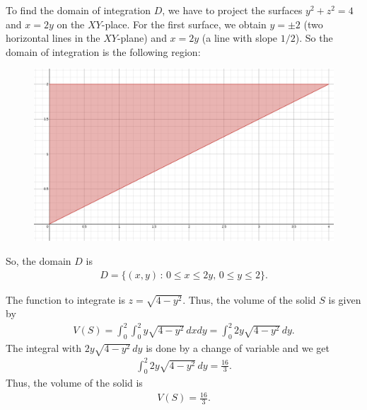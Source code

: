	To find the domain of integration $D$, we have to project the surfaces $y^2 + z^2 = 4$ and $x = 2y$ on the $XY$-place. For the first surface, we obtain $y = \pm 2$ (two horizontal lines in the $XY$-plane) and $x = 2y$ (a line with slope $1/2$). So the domain of integration is the following region:
	\begin{figure}[h]
	\centering
	\includegraphics[scale=0.2]{sketch-Exo30_Domain.png}
	\end{figure}
	So, the domain $D$ is
		\begin{align*}
		D = \{ (x, y) \, : \, 0 \leq x \leq 2y \text{, } 0 \leq y \leq 2 \} .
		\end{align*}
	
	The function to integrate is $z = \sqrt{4 - y^2}$. Thus, the volume of the solid $S$ is given by
		\begin{align*}
		V (S) = \int_0^2 \int_{0}^2y \sqrt{4 - y^2} \, dx dy = \int_0^2 2y\sqrt{4 - y^2} \, dy .
		\end{align*}
	The integral with $2y \sqrt{4 - y^2} \, dy$ is done by a change of variable and we get
		\begin{align*}
		\int_0^2 2y \sqrt{4 - y^2} \, dy = \frac{16}{3} .
		\end{align*}
	Thus, the volume of the solid is
		\begin{align*}
		V (S) = \frac{16}{3} .
		\end{align*}
	
	\spc
	
